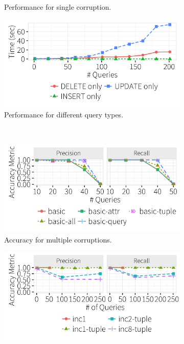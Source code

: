 \begin{figure}[h]
\begin{subfigure}[t]{.33\textwidth}
    \caption{Performance for single corruption.}
    \label{f:singlequeryinc_time} 
    \end{subfigure}
    \begin{subfigure}[t]{.33\textwidth}
    \includegraphics[width = .99\columnwidth]{figures/indelup_time}
    \vspace*{-.25in}
    \caption{Performance for different query types.}
    \label{f:indelup_time} 
    \end{subfigure}
    \vspace*{0.2in}
    \\
    \hspace*{-.1in}
    \begin{subfigure}[t]{.33\textwidth}
    \includegraphics[width = .99\columnwidth]{figures/multi_pr}
    \vspace*{-.25in}
    \caption{Accuracy for multiple corruptions.}
    \label{f:multi_acc} 
    \end{subfigure}
    \begin{subfigure}[t]{.33\textwidth}
    \includegraphics[width = .99\columnwidth]{figures/incrementalcompare_acc}

\end{subfigure}
\end{figure}
